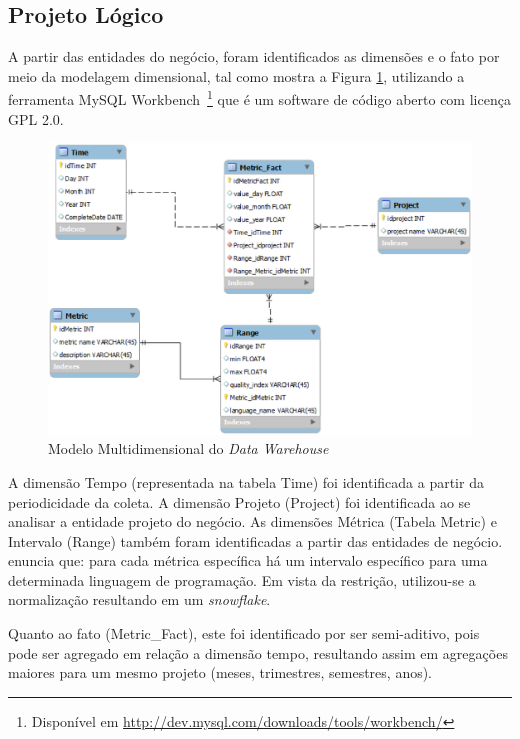 \subsection{Projeto Lógico}

A partir das entidades do negócio, foram identificados as dimensões e o fato por meio da modelagem dimensional, tal como mostra a Figura \ref{esquema}, utilizando a ferramenta MySQL Workbench~\footnote{Disponível em \url{http://dev.mysql.com/downloads/tools/workbench/}} que é um software de código aberto com licença GPL 2.0.


\begin{figure}[ht!]
\centering
\includegraphics[keepaspectratio=false,scale=0.60]{figuras/esquema.eps}
\caption{Modelo Multidimensional do \textit{Data Warehouse}}
\label{esquema}
\end{figure}
\FloatBarrier

A dimensão Tempo (representada na tabela Time) foi identificada a partir da periodicidade da coleta. A dimensão Projeto (Project) foi identificada ao se analisar a entidade projeto do negócio. As dimensões Métrica (Tabela Metric) e Intervalo (Range) também foram identificadas a partir das entidades de negócio.  enuncia que: para cada métrica específica há um intervalo específico para uma determinada linguagem de programação. Em vista da restrição, utilizou-se a normalização resultando em um \textit{snowflake}.

Quanto ao fato (Metric\_Fact), este foi identificado por ser semi-aditivo, pois pode ser agregado em relação a dimensão tempo, resultando assim em agregações maiores para um mesmo projeto (meses, trimestres, semestres, anos).


